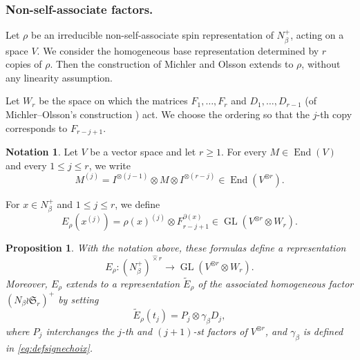 \documentclass[reqno]{amsart}
\DeclareMathOperator{\GL}{GL}
\DeclareMathOperator{\End}{End}
\newcommand{\sym}{\mathfrak{S}}
\newtheorem{proposition}[theorem]{Proposition}
\theoremstyle{definition}
\newtheorem{notation}[theorem]{Notation}
\begin{document}
\subsubsection{Non-self-associate factors.}

Let $\rho$ be an irreducible non-self-associate spin representation of
$N_\beta^+$, acting on a space $V$. We consider the homogeneous base
representation determined by $r$ copies of $\rho$. Then the construction
of Michler and Olsson extends to $\rho$, without any linearity assumption.

Let $W_r$ be the space on which the matrices $ F_1,\ldots,F_r $ and $
D_1,\ldots,D_{r-1} $ (of Michler--Olsson's construction
\cite[Lemma~4.2]{MichlerOlsson}) act. We choose the ordering so that the
$j$-th copy corresponds to $F_{r-j+1}$.

\begin{notation}
Let $V$ be a vector space and let $r\geq 1$. For every $M\in\End(V)$ and
every $1\leq j\leq r$, we write
\[
M^{(j)}
=
I^{\otimes(j-1)}\otimes M\otimes I^{\otimes(r-j)}
\in \End(V^{\otimes r}).
\]
\end{notation}

For $x\in N_\beta^+$ and $1\leq j\leq r$, we define
\[
E_\rho(x^{(j)})
=
\rho(x)^{(j)}\otimes F_{r-j+1}^{\partial(x)}
\in
\GL(V^{\otimes r}\otimes W_r).
\]

\begin{proposition}
With the notation above, these formulas define a representation
\[
E_\rho:
(N_\beta^+)^{\widehat\times r}
\longrightarrow
\GL(V^{\otimes r}\otimes W_r).
\]
Moreover, $E_\rho$ extends to a representation $\widetilde E_\rho$ of
the associated homogeneous factor $(N_\beta\wr \sym_r)^+$ by setting
\begin{equation}
\label{eq:defopnsa}
\widetilde E_\rho(t_j)=P_j\otimes \gamma_\beta D_j,
\end{equation}
where $P_j$ interchanges the $j$-th and $(j+1)$-st factors of $V^{\otimes
r}$, and $\gamma_\beta$ is defined in \eqref{eq:defsignechoix}.
\end{proposition}
\end{document}
